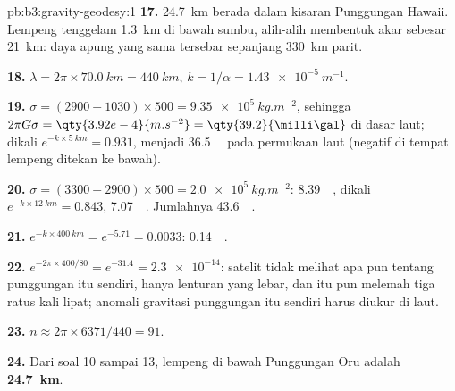 \begin{solution}{pb:b3:gravity-geodesy:1}
\textbf{17.} \qty{24.7}{km} berada dalam kisaran Punggungan Hawaii. Lempeng
tenggelam \qty{1.3}{km} di bawah sumbu, alih-alih membentuk akar sebesar
\qty{21}{km}: daya apung yang sama tersebar sepanjang \qty{330}{km} parit.

\textbf{18.} $\lambda = 2\pi\times\qty{70.0}{km} = \qty{440}{km}$,
$k = 1/\alpha = \qty{1.43e-5}{m^{-1}}$.

\textbf{19.} $\sigma = (2900 - 1030)\times500 = \qty{9.35e5}{kg.m^{-2}}$, sehingga
$2\pi G\sigma = \qty{3.92e-4}{m.s^{-2}} = \qty{39.2}{\milli\gal}$ di dasar laut;
dikali $e^{-k\times\qty{5}{km}} = 0.931$, menjadi \qty{36.5}{\milli\gal} pada permukaan laut
(negatif di tempat lempeng ditekan ke bawah).

\textbf{20.} $\sigma = (3300 - 2900)\times500 = \qty{2.0e5}{kg.m^{-2}}$:
\qty{8.39}{\milli\gal}, dikali $e^{-k\times\qty{12}{km}} = 0.843$,
\qty{7.07}{\milli\gal}. Jumlahnya \qty{43.6}{\milli\gal}.

\textbf{21.} $e^{-k\times\qty{400}{km}} = e^{-5.71} = 0.0033$: \qty{0.14}{\milli\gal}.

\textbf{22.} $e^{-2\pi\times400/80} = e^{-31.4} = \num{2.3e-14}$: satelit
tidak melihat apa pun tentang punggungan itu sendiri, hanya lenturan yang lebar, dan itu pun
melemah tiga ratus kali lipat; anomali gravitasi punggungan itu sendiri harus diukur di laut.

\textbf{23.} $n \approx 2\pi\times6371/440 = 91$.

\textbf{24.} Dari soal 10 sampai 13, 
lempeng di bawah Punggungan Oru adalah
\textbf{\qty[text-series-to-math=true]{24.7}{km}}.
\end{solution}
